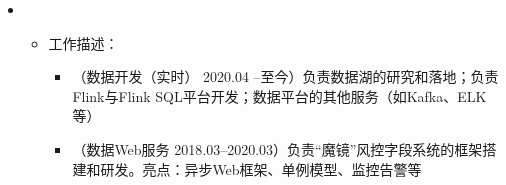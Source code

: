   \begin{itemize}[leftmargin=*]
    \item
      {\small
      \begin{itemize}
        \item 工作描述：
        \begin{itemize}
          \item （数据开发（实时） 2020.04 --至今）负责数据湖的研究和落地；负责Flink与Flink SQL平台开发；数据平台的其他服务（如Kafka、ELK等）
          \item （数据Web服务 2018.03--2020.03）负责“魔镜”风控字段系统的框架搭建和研发。亮点：异步Web框架、单例模型、监控告警等
        \end{itemize}        
      \end{itemize}
      }
  \end{itemize}
        
